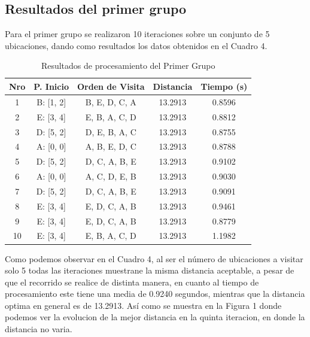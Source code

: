 \documentclass{article}
\begin{document}
\newpage
\subsection{Resultados del primer grupo}

Para el primer grupo se realizaron 10 iteraciones sobre un conjunto de 5 ubicaciones, dando como resultados los datos obtenidos en el Cuadro 4.

  \begin{table}[h]
    \centering
    \caption{Resultados de procesamiento del Primer Grupo}
    \begin{tabular}{|c|c|c|c|c|}
      \hline
      \textbf{Nro} & \textbf{P. Inicio} & \textbf{Orden de Visita} & \textbf{Distancia} & \textbf{Tiempo (s)}\\
      \hline
      1 & B: [1, 2] & B, E, D, C, A & 13.2913 & 0.8596 \\
      \hline
      2 & E: [3, 4] & E, B, A, C, D & 13.2913 & 0.8812 \\
      \hline
      3 & D: [5, 2] & D, E, B, A, C & 13.2913 & 0.8755 \\
      \hline
      4 & A: [0, 0] & A, B, E, D, C & 13.2913 & 0.8788 \\
      \hline
      5 & D: [5, 2] & D, C, A, B, E & 13.2913 & 0.9102 \\
      \hline
      6 & A: [0, 0] & A, C, D, E, B & 13.2913 & 0.9030 \\
      \hline
      7 & D: [5, 2] & D, C, A, B, E & 13.2913 & 0.9091 \\
      \hline
      8 & E: [3, 4] & E, D, C, A, B & 13.2913 & 0.9461 \\
      \hline
      9 & E: [3, 4] & E, D, C, A, B & 13.2913 & 0.8779 \\
      \hline
      10 & E: [3, 4] & E, B, A, C, D & 13.2913 & 1.1982 \\
      \hline
    \end{tabular}
  \end{table}

  Como podemos observar en el Cuadro 4, al ser el número de ubicaciones a visitar solo 5 todas las iteraciones muestrane la misma distancia aceptable, a pesar de que el recorrido se realice de distinta manera, en cuanto al tiempo de procesamiento este tiene una media de 0.9240 segundos, mientras que la distancia optima en general es de 13.2913. Así como se muestra en la Figura 1 donde podemos ver la evolucion de la mejor distancia en la quinta iteracion, en donde la distancia no varia.\\
\end{document}
